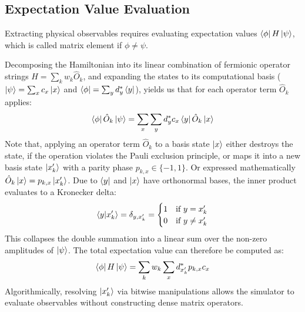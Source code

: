 \subsection{Expectation Value Evaluation}\label{sec:expectation-value-evaluation}
Extracting physical observables requires evaluating expectation values $\bra{\phi} H \ket{\psi}$, which is called matrix element if $\phi \neq \psi$.

Decomposing the Hamiltonian into its linear combination of fermionic operator strings $H = \sum_k w_k \hat{O}_k$, and expanding the states to its computational basis ($\ket{\psi} = \sum_x c_x \ket{x}$ and $\bra{\phi} = \sum_y d_y^* \bra{y}$), yields us that for each operator term $\hat{O}_k$ applies:
\begin{equation}
    \bra{\phi} \hat{O}_k \ket{\psi} = \sum_{x} \sum_{y} d_y^* c_x \bra{y} \hat{O}_k \ket{x}
\end{equation}
Note that, applying an operator term $\hat{O}_k$ to a basis state $\ket{x}$ either destroys the state, if the operation violates the Pauli exclusion principle, or maps it into a new basis state $\ket{x'_k}$ with a parity phase $p_{k,x} \in \{-1, 1\}$.
Or expressed mathematically $\hat{O}_k \ket{x} = p_{k,x} \ket{x'_k}$.
Due to $\bra{y}$ and $\ket{x}$ have orthonormal bases, the inner product evaluates to a Kronecker delta:
\begin{equation}
    \bra{y} \ket{x'_k} = \delta_{y, x'_k} = \begin{cases} 1 & \text{if } y = x'_k \\ 0 & \text{if } y \neq x'_k \end{cases}
\end{equation}
This collapses the double summation into a linear sum over the non-zero amplitudes of $\ket{\psi}$.
The total expectation value can therefore be computed as:
\begin{equation}
    \bra{\phi} H \ket{\psi} = \sum_k w_k \sum_{x} d_{x'_k}^* p_{k,x} c_x\label{eq:expectation-value-decomposed}
\end{equation}
Algorithmically, resolving $\ket{x'_k}$ via bitwise manipulations allows the simulator to evaluate observables without constructing dense matrix operators.
\cite[chapter II.A, II.B]{kohda2022quantum}\cite[Chapter 1.2.1, 1.3.3, 1.4.3, 7.7]{sakurai2020modern}\cite[chapter 6.6]{benito_kottmann_qc_2025}


